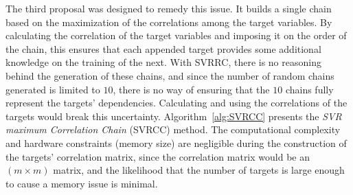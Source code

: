 \documentclass[reqno]{vcuthesis}
\numberwithin{equation}{chapter}
\begin{document}
The third proposal was designed to remedy this issue. It builds a single chain based on the maximization of the correlations among the target variables. By calculating the correlation of the target variables and imposing it on the order of the chain, this ensures that each appended target provides some additional knowledge on the training of the next. With SVRRC, there is no reasoning behind the generation of these chains, and since the number of random chains generated is limited to $10$, there is no way of ensuring that the $10$ chains fully represent the targets' dependencies. Calculating and using the correlations of the targets would break this uncertainty. Algorithm~\ref{alg:SVRCC} presents the \textit{SVR maximum Correlation Chain} (SVRCC) method. The computational complexity and hardware constraints (memory size) are negligible during the construction of the targets' correlation matrix, since the correlation matrix would be an $(m \times m)$ matrix, and the likelihood that the number of targets is large enough to cause a memory issue is minimal. 
\end{document}
